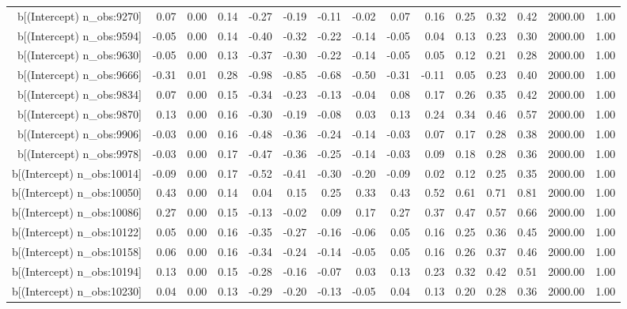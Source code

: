 \begin{table}[ht]
\begin{tabular}{rrrrrrrrrrrrrrr}
  b[(Intercept) n\_obs:9270] & 0.07 & 0.00 & 0.14 & -0.27 & -0.19 & -0.11 & -0.02 & 0.07 & 0.16 & 0.25 & 0.32 & 0.42 & 2000.00 & 1.00 \\ 
  b[(Intercept) n\_obs:9594] & -0.05 & 0.00 & 0.14 & -0.40 & -0.32 & -0.22 & -0.14 & -0.05 & 0.04 & 0.13 & 0.23 & 0.30 & 2000.00 & 1.00 \\ 
  b[(Intercept) n\_obs:9630] & -0.05 & 0.00 & 0.13 & -0.37 & -0.30 & -0.22 & -0.14 & -0.05 & 0.05 & 0.12 & 0.21 & 0.28 & 2000.00 & 1.00 \\ 
  b[(Intercept) n\_obs:9666] & -0.31 & 0.01 & 0.28 & -0.98 & -0.85 & -0.68 & -0.50 & -0.31 & -0.11 & 0.05 & 0.23 & 0.40 & 2000.00 & 1.00 \\ 
  b[(Intercept) n\_obs:9834] & 0.07 & 0.00 & 0.15 & -0.34 & -0.23 & -0.13 & -0.04 & 0.08 & 0.17 & 0.26 & 0.35 & 0.42 & 2000.00 & 1.00 \\ 
  b[(Intercept) n\_obs:9870] & 0.13 & 0.00 & 0.16 & -0.30 & -0.19 & -0.08 & 0.03 & 0.13 & 0.24 & 0.34 & 0.46 & 0.57 & 2000.00 & 1.00 \\ 
  b[(Intercept) n\_obs:9906] & -0.03 & 0.00 & 0.16 & -0.48 & -0.36 & -0.24 & -0.14 & -0.03 & 0.07 & 0.17 & 0.28 & 0.38 & 2000.00 & 1.00 \\ 
  b[(Intercept) n\_obs:9978] & -0.03 & 0.00 & 0.17 & -0.47 & -0.36 & -0.25 & -0.14 & -0.03 & 0.09 & 0.18 & 0.28 & 0.36 & 2000.00 & 1.00 \\ 
  b[(Intercept) n\_obs:10014] & -0.09 & 0.00 & 0.17 & -0.52 & -0.41 & -0.30 & -0.20 & -0.09 & 0.02 & 0.12 & 0.25 & 0.35 & 2000.00 & 1.00 \\ 
  b[(Intercept) n\_obs:10050] & 0.43 & 0.00 & 0.14 & 0.04 & 0.15 & 0.25 & 0.33 & 0.43 & 0.52 & 0.61 & 0.71 & 0.81 & 2000.00 & 1.00 \\ 
  b[(Intercept) n\_obs:10086] & 0.27 & 0.00 & 0.15 & -0.13 & -0.02 & 0.09 & 0.17 & 0.27 & 0.37 & 0.47 & 0.57 & 0.66 & 2000.00 & 1.00 \\ 
  b[(Intercept) n\_obs:10122] & 0.05 & 0.00 & 0.16 & -0.35 & -0.27 & -0.16 & -0.06 & 0.05 & 0.16 & 0.25 & 0.36 & 0.45 & 2000.00 & 1.00 \\ 
  b[(Intercept) n\_obs:10158] & 0.06 & 0.00 & 0.16 & -0.34 & -0.24 & -0.14 & -0.05 & 0.05 & 0.16 & 0.26 & 0.37 & 0.46 & 2000.00 & 1.00 \\ 
  b[(Intercept) n\_obs:10194] & 0.13 & 0.00 & 0.15 & -0.28 & -0.16 & -0.07 & 0.03 & 0.13 & 0.23 & 0.32 & 0.42 & 0.51 & 2000.00 & 1.00 \\ 
  b[(Intercept) n\_obs:10230] & 0.04 & 0.00 & 0.13 & -0.29 & -0.20 & -0.13 & -0.05 & 0.04 & 0.13 & 0.20 & 0.28 & 0.36 & 2000.00 & 1.00 \\ 

\end{tabular}
\end{table}
